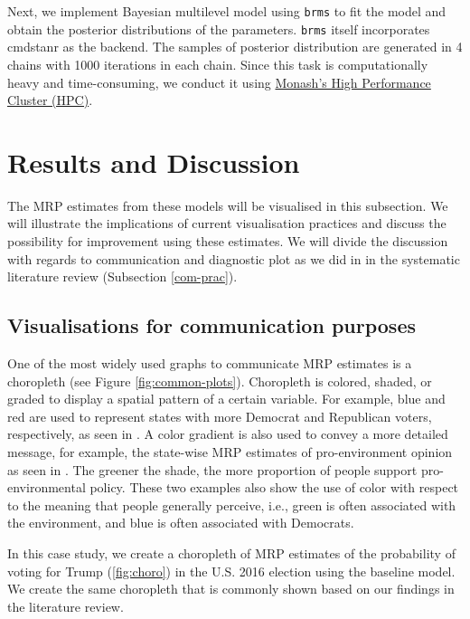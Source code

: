 \documentclass{monashthesis}
\begin{document}
Next, we implement Bayesian multilevel model using \texttt{brms} \autocite{brms} to fit the model and obtain the posterior distributions of the parameters. \texttt{brms} itself incorporates cmdstanr \autocite{cmdstanr} as the backend. The samples of posterior distribution are generated in 4 chains with 1000 iterations in each chain. Since this task is computationally heavy and time-consuming, we conduct it using \href{https://docs.monarch.erc.monash.edu/MonARCH/aboutMonArch.html}{Monash's High Performance Cluster (HPC)}.

\hypertarget{results-and-discussion}{%
\section{Results and Discussion}\label{results-and-discussion}}

The MRP estimates from these models will be visualised in this subsection. We will illustrate the implications of current visualisation practices and discuss the possibility for improvement using these estimates. We will divide the discussion with regards to communication and diagnostic plot as we did in in the systematic literature review (Subsection \ref{com-prac}).

\hypertarget{visualisations-for-communication-purposes}{%
\subsection{Visualisations for communication purposes}\label{visualisations-for-communication-purposes}}

One of the most widely used graphs to communicate MRP estimates is a choropleth (see Figure \ref{fig:common-plots}). Choropleth is colored, shaded, or graded to display a spatial pattern of a certain variable. For example, blue and red are used to represent states with more Democrat and Republican voters, respectively, as seen in \textcite{GhitzaYair2013DIwM}. A color gradient is also used to convey a more detailed message, for example, the state-wise MRP estimates of pro-environment opinion as seen in \textcite{EunKimSung2018Epoi}. The greener the shade, the more proportion of people support pro-environmental policy. These two examples also show the use of color with respect to the meaning that people generally perceive, i.e., green is often associated with the environment, and blue is often associated with Democrats.

In this case study, we create a choropleth of MRP estimates of the probability of voting for Trump (\ref{fig:choro}) in the U.S. 2016 election using the baseline model. We create the same choropleth that is commonly shown based on our findings in the literature review.
\end{document}
